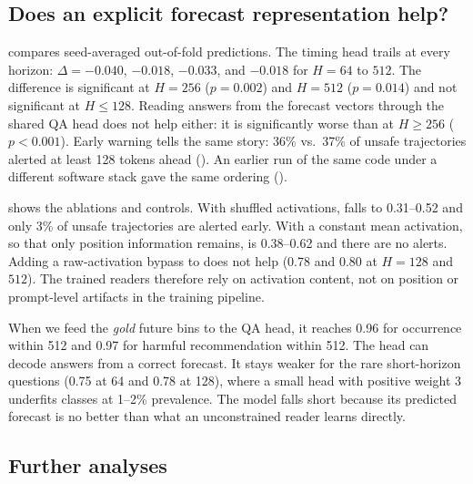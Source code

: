 \subsection{Does an explicit forecast representation help?}
\label{sec:rq2}



 compares seed-averaged out-of-fold predictions. The \forecast timing head trails \direct at every horizon: $\Delta$\auroc $=-0.040$, $-0.018$, $-0.033$, and $-0.018$ for $H=64$ to $512$. The difference is significant at $H{=}256$ ($p{=}0.002$) and $H{=}512$ ($p{=}0.014$) and not significant at $H\le128$. Reading answers from the forecast vectors through the shared QA head does not help either: it is significantly worse than \direct at $H\ge256$ ($p<0.001$). Early warning tells the same story: 36\% vs.\ 37\% of unsafe trajectories alerted at least 128 tokens ahead (). An earlier run of the same code under a different software stack gave the same ordering ().



 shows the ablations and controls. With shuffled activations, \auroc falls to 0.31--0.52 and only 3\% of unsafe trajectories are alerted early. With a constant mean activation, so that only position information remains, \auroc is 0.38--0.62 and there are no alerts. Adding a raw-activation bypass to \forecast does not help (0.78 and 0.80 at $H{=}128$ and $512$). The trained readers therefore rely on activation content, not on position or prompt-level artifacts in the training pipeline.

When we feed the \emph{gold} future bins to the \forecast QA head, it reaches 0.96 for occurrence within 512 and 0.97 for harmful recommendation within 512. The head can decode answers from a correct forecast. It stays weaker for the rare short-horizon questions (0.75 at 64 and 0.78 at 128), where a small head with positive weight 3 underfits classes at 1--2\% prevalence. The \forecast model falls short because its predicted forecast is no better than what an unconstrained reader learns directly.

\subsection{Further analyses}
\label{sec:extra}

